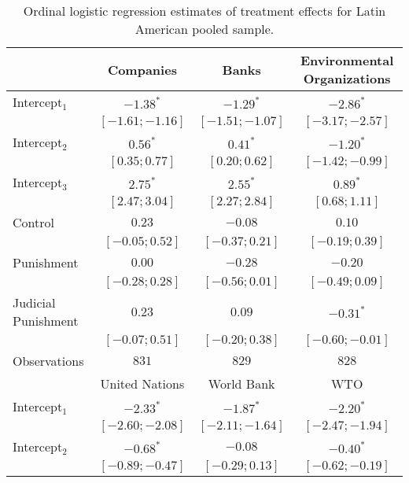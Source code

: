 \begin{table}[h]
\begin{center}
\caption{Ordinal logistic regression estimates of treatment effects for Latin American pooled sample.}
\begin{threeparttable}
\begin{tabular}{l c c c}
\hline
 & Companies & Banks & Environmental
Organizations \\
\hline
Intercept$_1$       & $-1.38^{*}$       & $-1.29^{*}$       & $-2.86^{*}$       \\
                    & $ [-1.61; -1.16]$ & $ [-1.51; -1.07]$ & $ [-3.17; -2.57]$ \\
Intercept$_2$       & $0.56^{*}$        & $0.41^{*}$        & $-1.20^{*}$       \\
                    & $ [ 0.35;  0.77]$ & $ [ 0.20;  0.62]$ & $ [-1.42; -0.99]$ \\
Intercept$_3$       & $2.75^{*}$        & $2.55^{*}$        & $0.89^{*}$        \\
                    & $ [ 2.47;  3.04]$ & $ [ 2.27;  2.84]$ & $ [ 0.68;  1.11]$ \\
Control             & $0.23$            & $-0.08$           & $0.10$            \\
                    & $ [-0.05;  0.52]$ & $ [-0.37;  0.21]$ & $ [-0.19;  0.39]$ \\
Punishment          & $0.00$            & $-0.28$           & $-0.20$           \\
                    & $ [-0.28;  0.28]$ & $ [-0.56;  0.01]$ & $ [-0.49;  0.09]$ \\
Judicial Punishment & $0.23$            & $0.09$            & $-0.31^{*}$       \\
                    & $ [-0.07;  0.51]$ & $ [-0.20;  0.38]$ & $ [-0.60; -0.01]$ \\
\hline
Observations        & $831$             & $829$             & $828$             \\
\hline
 & United Nations & World Bank & WTO \\
\hline
Intercept$_1$       & $-2.33^{*}$       & $-1.87^{*}$       & $-2.20^{*}$       \\
                    & $ [-2.60; -2.08]$ & $ [-2.11; -1.64]$ & $ [-2.47; -1.94]$ \\
Intercept$_2$       & $-0.68^{*}$       & $-0.08$           & $-0.40^{*}$       \\
                    & $ [-0.89; -0.47]$ & $ [-0.29;  0.13]$ & $ [-0.62; -0.19]$ \\

\end{tabular}
\end{threeparttable}
\end{center}
\end{table}
